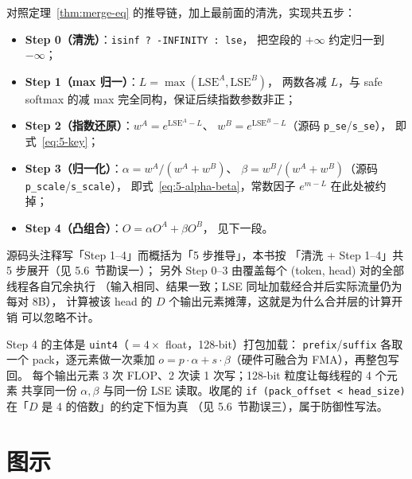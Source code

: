 

对照定理~\ref{thm:merge-eq} 的推导链，加上最前面的清洗，实现共五步：
\begin{itemize}
  \item \textbf{Step 0（清洗）}：\texttt{isinf ? -INFINITY : lse}，
        把空段的 $+\infty$ 约定归一到 $-\infty$；
  \item \textbf{Step 1（max 归一）}：$L = \max(\mathrm{LSE}^{A}, \mathrm{LSE}^{B})$，
        两数各减 $L$，与 safe softmax 的减 max 完全同构，保证后续指数参数非正；
  \item \textbf{Step 2（指数还原）}：$w^{A} = e^{\mathrm{LSE}^{A} - L}$、
        $w^{B} = e^{\mathrm{LSE}^{B} - L}$（源码 \texttt{p\_se}/\texttt{s\_se}），
        即式~\ref{eq:5-key}；
  \item \textbf{Step 3（归一化）}：$\alpha = w^{A}/(w^{A}+w^{B})$、
        $\beta = w^{B}/(w^{A}+w^{B})$（源码 \texttt{p\_scale}/\texttt{s\_scale}），
        即式~\ref{eq:5-alpha-beta}，常数因子 $e^{m-L}$ 在此处被约掉；
  \item \textbf{Step 4（凸组合）}：$O = \alpha O^{A} + \beta O^{B}$，
        见下一段。
\end{itemize}
源码头注释写「Step 1--4」而概括为「5 步推导」，本书按
「清洗 + Step 1--4」共 5 步展开（见 5.6~节勘误一）；
另外 Step 0--3 由覆盖每个 (token, head) 对的全部线程各自冗余执行
（输入相同、结果一致；LSE 同址加载经合并后实际流量仍为每对 8B），
计算被该 head 的 $D$ 个输出元素摊薄，这就是为什么合并层的计算开销
可以忽略不计。



Step 4 的主体是 \texttt{uint4}（$=4 \times$ float，128-bit）打包加载：
\texttt{prefix}/\texttt{suffix} 各取一个 pack，逐元素做一次乘加
$o = p \cdot \alpha + s \cdot \beta$（硬件可融合为 FMA），再整包写回。
每个输出元素 3 次 FLOP、2 次读 1 次写；128-bit 粒度让每线程的 4 个元素
共享同一份 $\alpha, \beta$ 与同一份 LSE 读取。收尾的
\texttt{if \allowbreak{}(pack\_\allowbreak{}offset \allowbreak{}< head\_\allowbreak{}size)} 在「$D$ 是 4 的倍数」的约定下恒为真
（见 5.6~节勘误三），属于防御性写法。

\needspace{122mm}

\section{图示}

